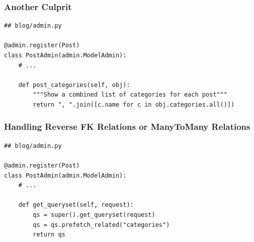 \documentclass[aspectratio=169]{beamer}
\begin{document}
\begin{frame}[fragile]
\frametitle{Another Culprit}

{\tiny
\begin{verbatim}
## blog/admin.py

@admin.register(Post)
class PostAdmin(admin.ModelAdmin):
    # ...

    def post_categories(self, obj):
        """Show a combined list of categories for each post"""
        return ", ".join([c.name for c in obj.categories.all()])
\end{verbatim}
}

\end{frame}


\begin{frame}[fragile]
\frametitle{Handling Reverse FK Relations or ManyToMany Relations}

{\tiny
\begin{verbatim}
## blog/admin.py

@admin.register(Post)
class PostAdmin(admin.ModelAdmin):
    # ...

    def get_queryset(self, request):
        qs = super().get_queryset(request)
        qs = qs.prefetch_related("categories")
        return qs
\end{verbatim}
}

\end{frame}


\begin{frame}
  \begin{figure}[p]
    \centering
  \end{figure}
\end{frame}
\end{document}
